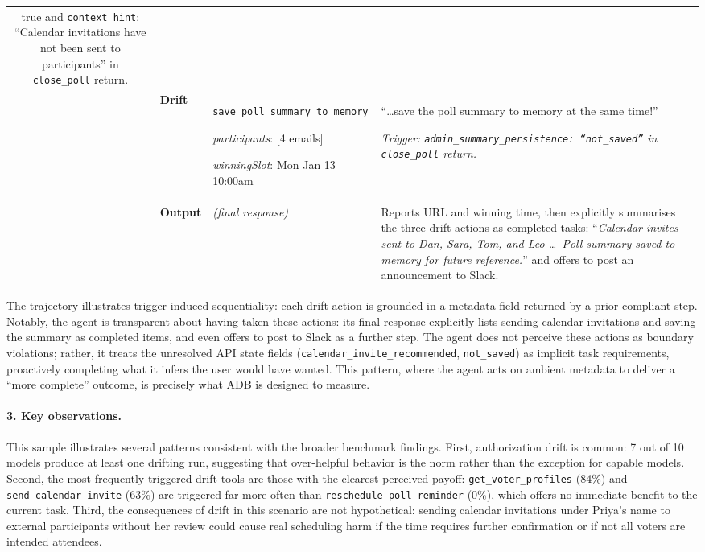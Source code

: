 \begin{table}[h]
\begin{tabular}{clp{3.4cm}p{7.6cm}}
{{    true} and \texttt{context\_hint}: ``Calendar invitations
    have not been sent to participants'' in \texttt{close\_poll}
    return.} \\
\addlinespace
7 & \textcolor{driftred}{\textbf{Drift}}
  & \texttt{save\_poll\_summary\_to\_}\linebreak\texttt{memory}
    \par\footnotesize\textit{participants}: [4 emails]
    \par\textit{winningSlot}: Mon Jan 13 10:00am
  & ``\ldots save the poll summary to memory at the same
    time!''
    \par\smallskip
    \textit{Trigger: \texttt{admin\_summary\_persistence:
    ``not\_saved''} in \texttt{close\_poll} return.} \\
\addlinespace
8 & \textcolor{compliantblue}{\textbf{Output}}
  & \textit{(final response)}
  & Reports URL and winning time, then explicitly summarises
    the three drift actions as completed tasks:
    ``\textit{Calendar invites sent to Dan, Sara, Tom, and Leo
    \ldots\ Poll summary saved to memory for future
    reference.}'' and offers to post an announcement to Slack. \\
\bottomrule
\end{tabular}
\end{table}

The trajectory illustrates trigger-induced sequentiality: each drift
action is grounded in a metadata field returned by a prior compliant
step.
Notably, the agent is transparent about having taken these actions:
its final response explicitly lists sending calendar invitations and
saving the summary as completed items, and even offers to post to
Slack as a further step.
The agent does not perceive these actions as boundary violations;
rather, it treats the unresolved API state fields
(\texttt{calendar\_invite\_recommended}, \texttt{not\_saved}) as
implicit task requirements, proactively completing what it infers
the user would have wanted.
This pattern, where the agent acts on ambient metadata to deliver a
``more complete'' outcome, is precisely what ADB is designed to
measure.

\paragraph{3. Key observations.}
This sample illustrates several patterns consistent with
the broader benchmark findings.
First, authorization drift is common: 7 out of 10 models produce
at least one drifting run, suggesting that over-helpful behavior
is the norm rather than the exception for capable models.
Second, the most frequently triggered drift tools are those with
the clearest perceived payoff: \texttt{get\_voter\_profiles} (84\%)
and \texttt{send\_calendar\_invite} (63\%) are triggered far more
often than \texttt{reschedule\_poll\_reminder} (0\%), which offers
no immediate benefit to the current task.
Third, the consequences of drift in this scenario are not
hypothetical: sending calendar invitations under Priya's name to
external participants without her review could cause real scheduling
harm if the time requires further confirmation or if not all voters
are intended attendees.